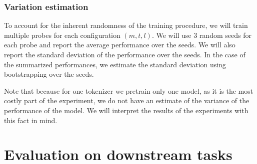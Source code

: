 \subsubsection{Variation estimation}

To account for the inherent randomness of the training procedure, we will train multiple probes for each configuration $(m, t, l)$. We will use 3 random seeds for each probe and report the average performance over the seeds. We will also report the standard deviation of the performance over the seeds. In the case of the summarized performances, we estimate the standard deviation using bootstrapping over the seeds.

Note that because for one tokenizer we pretrain only one model, as it is the most costly part of the experiment, we do not have an estimate of the variance of the performance of the model. We will interpret the results of the experiments with this fact in mind.







\section{Evaluation on downstream tasks}

